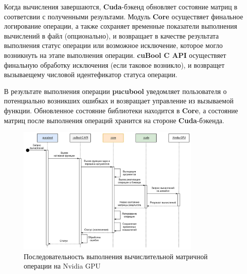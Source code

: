 Когда вычисления завершаются, \textbf{Cuda}-бэкенд обновляет состояние матриц в соответсвии с полученными результами. 
Модуль \textbf{Core} осуществяет финальное логирование операции, 
а также сохраняет временные показатели выполнения вычислений в файл (опционально), 
и возвращает в качестве результата выполнения статус операции или возможное исключение, 
которое могло возникнуть на этапе выполнения операции. 
\textbf{cuBool C API} осуществяет финальную обработку исключения (если таковое возникло), 
и возвращет вызываещему числовой идентефикатор статуса операции. 

В результате выполнения операции \textbf{pucubool} уведомляет пользователя о потенциально возникших ошибках и возвращает управление из вызываемой функции. 
Обновленное состояние библиотеки находится в \textbf{Core}, а состояние матриц после выполнения операций хранится на стороне \textbf{Cuda}-бэкенда. 

\begin{figure}[h]
    \centering
    \includegraphics[width=0.8\textwidth]{images/library_sequence_use.png}
    \caption{Последовательность выполнения вычислительной матричной операции на Nvidia GPU}
    \label{fig:cubool_sequence}
\end{figure}


